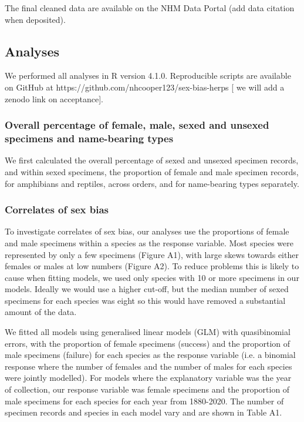 \documentclass[a4paper, 12pt]{article}
\begin{document}
The final cleaned data are available on the NHM Data Portal (add data citation when deposited). 

\subsection{Analyses}

We performed all analyses in R version 4.1.0\cite{R}. 
Reproducible scripts are available on GitHub at https://github.com/nhcooper123/sex-bias-herps [\cite{coopercode2022} we will add a zenodo link on acceptance].

\subsubsection{Overall percentage of female, male, sexed and unsexed specimens and name-bearing types}
We first calculated the overall percentage of sexed and unsexed specimen records, and within sexed specimens, the proportion of female and male specimen records, for amphibians and reptiles, across orders, and for name-bearing types separately. 

\subsubsection{Correlates of sex bias}
To investigate correlates of sex bias, our analyses use the proportions of female and male specimens within a species as the response variable. 
Most species were represented by only a few specimens (Figure A1), with large skews towards either females or males at low numbers (Figure A2). 
To reduce problems this is likely to cause when fitting models, we used only species with 10 or more specimens in our models. Ideally we would use a higher cut-off, but the median number of sexed specimens for each species was eight so this would have removed a substantial amount of the data. 

We fitted all models using generalised linear models (GLM) with quasibinomial errors, with the proportion of female specimens (success) and the proportion of male specimens (failure) for each species as the response variable (i.e. a binomial response where the number of females and the number of males for each species were jointly modelled). 
For models where the explanatory variable was the year of collection, our response variable was female specimens and the proportion of male specimens for each species for each year from 1880-2020. 
The number of specimen records and species in each model vary and are shown in Table A1.
\end{document}

